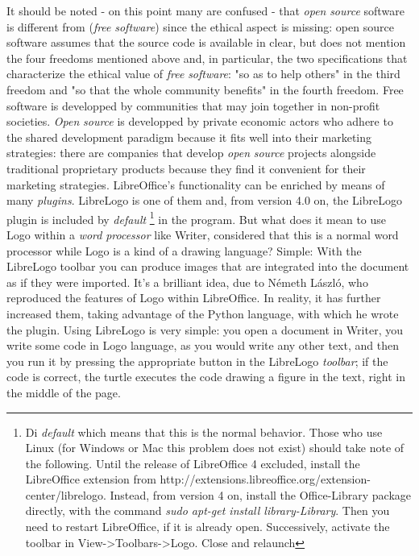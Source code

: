 It should be noted - on this point many are confused - that \textit{open} \textit{source} software is different from (\textit{free} \textit{software}) since the ethical aspect is missing: open source software assumes that the source code is available in clear, but does not mention the four freedoms mentioned above and, in particular, the two specifications that characterize the ethical value of \textit{free} \textit{software}: "so as to help others" in the third freedom and "so that the whole community benefits" in the fourth freedom. Free software is developped by communities that may join together in non-profit societies. \textit{Open} \textit{source} is developped by private economic actors who adhere to the shared development paradigm because it fits well into their marketing strategies: there are companies that develop \textit{open} \textit{source} projects alongside traditional proprietary products because they find it convenient for their marketing strategies. LibreOffice's functionality can be enriched by means of many \textit{plugins}. LibreLogo is one of them and, from version 4.0 on, the LibreLogo plugin is included by \textit{default} \footnote{Di \textit{default} which means that this is the normal behavior. Those who use Linux (for Windows or Mac this problem does not exist) should take note of the following. Until the release of LibreOffice 4 excluded, install the LibreOffice extension from http://extensions.libreoffice.org/extension-center/librelogo. Instead, from version 4 on, install the Office-Library package directly, with the command \textit{sudo apt-get install library-Library}. Then you need to restart LibreOffice, if it is already open. Successively, activate the toolbar in View->Toolbars->Logo. Close and relaunch} in the program. But what does it mean to use Logo within a \textit{word} \textit{processor} like Writer, considered that this is a normal word processor while Logo is a kind of a drawing language? Simple: With the LibreLogo toolbar you can produce images that are integrated into the document as if they were imported. It's a brilliant idea, due to Németh László, who reproduced the features of Logo within LibreOffice. In reality, it has further increased them, taking advantage of the Python language, with which he wrote the plugin. Using LibreLogo is very simple: you open a document in Writer, you write some code in Logo language, as you would write any other text, and then you run it by pressing the appropriate button in the LibreLogo \textit{toolbar}; if the code is correct, the turtle executes the code drawing a figure in the text, right in the middle of the page.

